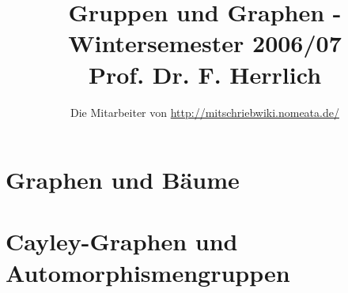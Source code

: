 \documentclass[a4paper, 10pt]{report}
\title{Gruppen und Graphen - Wintersemester 2006/07\\ Prof. Dr. F. Herrlich}
\author{Die Mitarbeiter von \url{http://mitschriebwiki.nomeata.de/}}
\begin{document}
\maketitle

\tableofcontents

\chapter{Graphen und Bäume}



\chapter{Cayley-Graphen und Automorphismengruppen}


\appendix
\renewcommand{\indexname}{Stichwortverzeichnis}
\printindex
\end{document}
